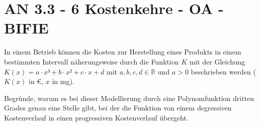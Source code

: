 \section{AN 3.3 - 6 Kostenkehre - OA - BIFIE}

\begin{beispiel}[AN 3.3]{1} %
In einem Betrieb können die Kosten zur Herstellung eines Produkts in einem bestimmten Intervall näherungsweise durch die Funktion $K$ mit der Gleichung \mbox{$K(x) = a \cdot x³ + b\cdot x² + c \cdot x + d$}
mit $a, b, c, d \in \mathbb{R}$ und $a > 0$ beschrieben werden ($K(x)$ in \euro, $x$ in mg). \leer

Begründe, warum es bei dieser Modellierung durch eine Polynomfunktion dritten Grades genau eine Stelle gibt, bei der die Funktion von einem degressiven Kostenverlauf in einen progressiven Kostenverlauf übergeht.

\end{beispiel}